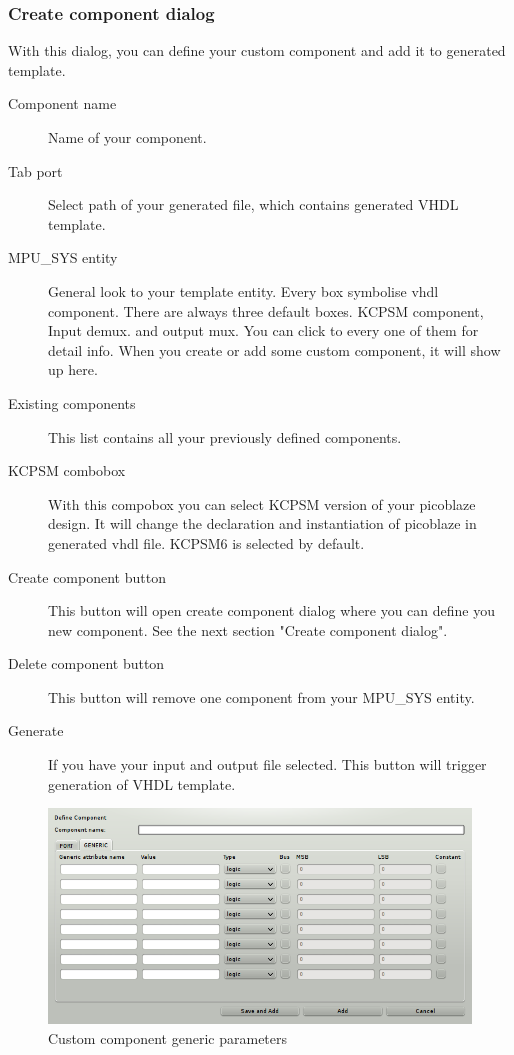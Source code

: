 \subsubsection{Create component dialog}
    With this dialog, you can define your custom component and add it to generated template. 
    \begin{description}
        \item [Component name]
            Name of your component.
        \item [Tab port]
            Select path of your generated file, which contains generated VHDL template.
        \item [MPU\_SYS entity]
            General look to your template entity. Every box symbolise vhdl component. There are always three default boxes. KCPSM component, Input demux.
            and output mux. You can click to every one of them for detail info. When you create or add some custom component, it will show
            up here.
        \item [Existing components]
            This list contains all your previously defined components.
        \item [KCPSM combobox]
            With this compobox you can select KCPSM version of your picoblaze design. It will change the declaration and instantiation of picoblaze
            in generated vhdl file. KCPSM6 is selected by default.
        \item [Create component button]
            This button will open create component dialog where you can define you new component. See the next section "Create component dialog".
        \item [Delete component button]
            This button will remove one component from your MPU\_SYS entity.
        \item [Generate]
            If you have your input and output file selected. This button will trigger generation of VHDL template.
    \end{description}

\begin{figure}[h]
    \centering
    \includegraphics[width=.5\textwidth]{img/VHDL_create_generic.png}
    \caption{Custom component generic parameters}
\end{figure}

